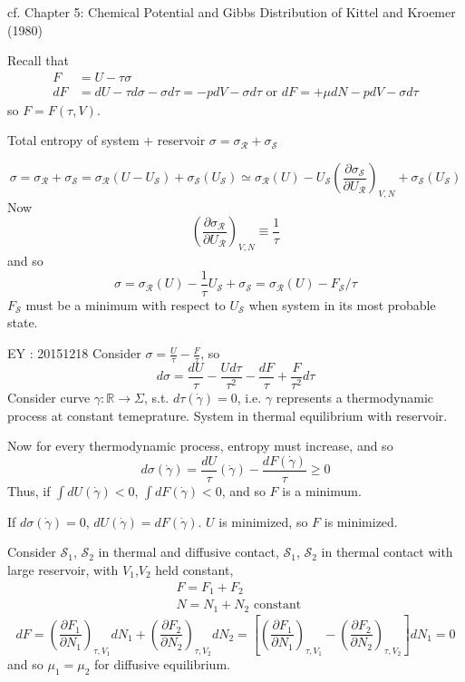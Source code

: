 \documentclass[10pt]{amsart}
\begin{document}
\begin{multicols*}{2}
cf. Chapter 5: Chemical Potential and Gibbs Distribution of Kittel and Kroemer (1980) \cite{CKittelHKroemer1980}

Recall that 
\[
\begin{aligned}
  F & = U - \tau \sigma \\ 
  dF & = dU - \tau d\sigma - \sigma d\tau = -pdV - \sigma d\tau \text{ or } dF = +\mu dN - pdV - \sigma d\tau 
\end{aligned}
\]
so $F = F(\tau,V)$.  

Total entropy of system $+$ reservoir $\sigma = \sigma_{\mathcal{R}} + \sigma_{\mathcal{S}}$ 

\[
\sigma = \sigma_{\mathcal{R}} + \sigma_{\mathcal{S}} = \sigma_{\mathcal{R}}(U- U_{\mathcal{S}}) + \sigma_{\mathcal{S}}(U_{\mathcal{S}}) \simeq \sigma_{\mathcal{R}}(U) - U_{\mathcal{S}} \left( \frac{ \partial \sigma_{\mathcal{S}} }{\partial U_{\mathcal{R}} } \right)_{V,N} + \sigma_{\mathcal{S}}(U_{\mathcal{S}})
\]
Now
\[
\left( \frac{ \partial \sigma_{\mathcal{R}} }{ \partial U_{\mathcal{R}} } \right)_{V,N} \equiv \frac{1}{\tau}
\]
and so 
\[
\sigma = \sigma_{\mathcal{R}}(U) - \frac{1}{\tau} U_{\mathcal{S}} + \sigma_{\mathcal{S}} = \sigma_{\mathcal{R}}(U) - F_{\mathcal{S}} / \tau
\]
$F_{\mathcal{S}}$ must be a minimum with respect to $U_{\mathcal{S}}$ when system in its most probable state.  

EY : 20151218 Consider $\sigma = \frac{U}{\tau} - \frac{F}{\tau}$, so
\[
d\sigma = \frac{dU}{\tau} - \frac{U d\tau }{\tau^2} - \frac{dF}{\tau} + \frac{F}{\tau^2} d\tau
\]
Consider curve $\gamma : \mathbb{R} \to \Sigma$, s.t. $d\tau(\dot{\gamma})=0$, i.e. $\gamma$ represents a thermodynamic process at constant temeprature.  System in thermal equilibrium with reservoir.  

Now for every thermodynamic process, entropy must increase, and so 
\[
d\sigma(\dot{\gamma} ) = \frac{dU}{\tau}(\dot{\gamma} ) - \frac{dF(\dot{\gamma} )}{\tau } \geq 0
\]
Thus, if $\int dU(\dot{\gamma} ) < 0$, $\int dF(\dot{\gamma} ) <0$, and so $F$ is a minimum.  

If $d\sigma(\dot{\gamma})=0$, $dU(\dot{\gamma}) = dF(\dot{\gamma})$.  $U$ is minimized, so $F$ is minimized.  

Consider $\mathcal{S}_1$, $\mathcal{S}_2$ in thermal and diffusive contact, $\mathcal{S}_1$, $\mathcal{S}_2$ in thermal contact with large reservoir, with $V_1$,$V_2$ held constant,
\[
\begin{aligned}
  & F = F_1 + F_2 \\ 
  & N = N_1 + N_2 \text{ constant } 
\end{aligned}
\]
\[
dF = \left( \frac{ \partial F_1}{ \partial N_1} \right)_{\tau,V_1} dN_1 +  \left( \frac{ \partial F_2}{ \partial N_2} \right)_{\tau,V_2} dN_2 = \left[  \left( \frac{ \partial F_1}{ \partial N_1} \right)_{\tau,V_1}  -  \left( \frac{ \partial F_2}{ \partial N_2} \right)_{\tau,V_2} \right] dN_1 = 0 
\]
and so $\mu_1 = \mu_2$ for diffusive equilibrium.  


\end{multicols*}
\end{document}
